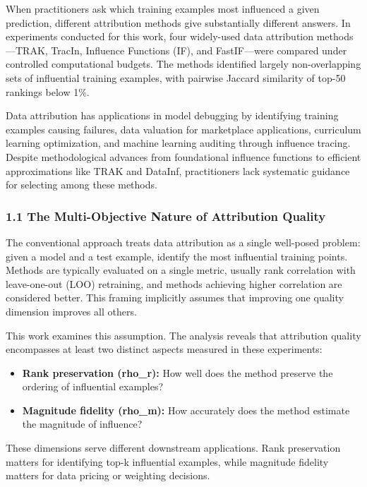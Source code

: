 
When practitioners ask which training examples most influenced a given prediction, different attribution methods give substantially different answers. In experiments conducted for this work, four widely-used data attribution methods---TRAK, TracIn, Influence Functions (IF), and FastIF---were compared under controlled computational budgets. The methods identified largely non-overlapping sets of influential training examples, with pairwise Jaccard similarity of top-50 rankings below 1\%.

Data attribution has applications in model debugging by identifying training examples causing failures, data valuation for marketplace applications, curriculum learning optimization, and machine learning auditing through influence tracing. Despite methodological advances from foundational influence functions to efficient approximations like TRAK and DataInf, practitioners lack systematic guidance for selecting among these methods.

\subsubsection{1.1 The Multi-Objective Nature of Attribution Quality}

The conventional approach treats data attribution as a single well-posed problem: given a model and a test example, identify the most influential training points. Methods are typically evaluated on a single metric, usually rank correlation with leave-one-out (LOO) retraining, and methods achieving higher correlation are considered better. This framing implicitly assumes that improving one quality dimension improves all others.

This work examines this assumption. The analysis reveals that attribution quality encompasses at least two distinct aspects measured in these experiments:

\begin{itemize}
\item \textbf{Rank preservation (rho\_r):} How well does the method preserve the ordering of influential examples?
\item \textbf{Magnitude fidelity (rho\_m):} How accurately does the method estimate the magnitude of influence?
\end{itemize}

These dimensions serve different downstream applications. Rank preservation matters for identifying top-k influential examples, while magnitude fidelity matters for data pricing or weighting decisions.

